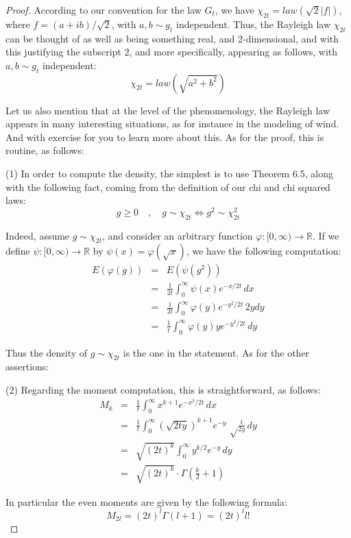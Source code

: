 \documentclass[12pt]{amsbook}
\begin{document}
\begin{proof}
According to our convention for the law $G_t$, we have $\chi_{2t}=law(\sqrt{2}|f|)$, where $f=(a+ib)/\sqrt{2}$, with $a,b\sim g_t$ independent. Thus, the Rayleigh law $\chi_{2t}$ can be thought of as well as being something real, and 2-dimensional, and with this justifying the subscript 2, and more specifically, appearing as follows, with $a,b\sim g_t$ independent:
$$\chi_{2t}=law(\sqrt{a^2+b^2})$$

Let us also mention that at the level of the phenomenology, the Rayleigh law appears in many interesting situations, as for instance in the modeling of wind. And with exercise for you to learn more about this. As for the proof, this is routine, as follows:

\medskip

(1) In order to compute the density, the simplest is to use Theorem 6.5, along with the following fact, coming from the definition of our chi and chi squared laws:
$$g\geq0\quad,\quad g\sim\chi_{2t}\iff g^2\sim\chi_{2t}^2$$

Indeed, assume $g\sim\chi_{2t}$, and consider an arbitrary function $\varphi:[0,\infty)\to\mathbb R$. If we define $\psi:[0,\infty)\to\mathbb R$ by $\psi(x)=\varphi(\sqrt{x})$, we have the following computation:
\begin{eqnarray*}
E(\varphi(g))
&=&E(\psi(g^2))\\
&=&\frac{1}{2t}\int_0^\infty\psi(x)e^{-x/2t}\,dx\\
&=&\frac{1}{2t}\int_0^\infty\varphi(y)e^{-y^2/2t}\,2ydy\\
&=&\frac{1}{t}\int_0^\infty\varphi(y)ye^{-y^2/2t}\,dy
\end{eqnarray*}

Thus the density of $g\sim\chi_{2t}$ is the one in the statement. As for the other assertions:

\medskip

(2) Regarding the moment computation, this is straightforward, as follows:
\begin{eqnarray*}
M_k
&=&\frac{1}{t}\int_0^\infty x^{k+1}e^{-x^2/2t}\,dx\\
&=&\frac{1}{t}\int_0^\infty\left(\sqrt{2ty}\right)^{k+1}e^{-y}\,{\sqrt\frac{t}{2y}}\,dy\\
&=&\sqrt{(2t)^k}\int_0^\infty y^{k/2}e^{-y}\,dy\\
&=&\sqrt{(2t)^k}\cdot\Gamma\left(\frac{k}{2}+1\right)
\end{eqnarray*}

In particular the even moments are given by the following formula:
$$M_{2l}=(2t)^l\Gamma(l+1)=(2t)^ll!$$


\end{proof}
\end{document}
